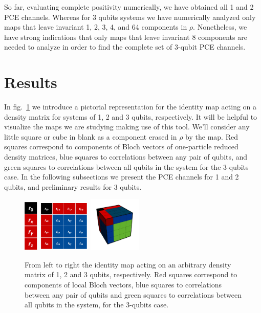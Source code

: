 \documentclass[11pt,dvipsnames]{article} %
\newcommand{\pce}{PCE}
\newcommand{\fref}[1]{fig.~\ref{#1}}  \newcommand{\tref}[1]{table~\ref{#1}}
\newcommand{\1}{\mathds{1}}
\begin{document}
So far, evaluating complete positivity numerically, we have obtained all 1 and 2 \pce{} channels. Whereas for $3$ qubits systems we have numerically analyzed only maps that leave 
invariant 1, 2, 3, 4, and 64 components in $\rho$. Nonetheless, we have strong
indications that only maps that leave invariant 8 components are 
needed to analyze in order to find the complete set of 3-qubit PCE 
channels.
\section*{Results} %
In \fref{fig:pictorial-rep-rho} we introduce a pictorial representation 
for the identity map acting on a density matrix for systems 
of 1, 2 and 3 qubits,
respectively. It will be helpful to visualize the maps we are studying 
making use of this tool. We'll consider any little square or cube in blank
as a component erased in $\rho$ by the map. 
Red squares correspond to components of Bloch vectors of one-particle reduced density matrices,
blue squares to correlations between any pair of qubits, and
green squares to correlations between all qubits in the system for
the 3-qubits case.
In the following subsections we present the PCE channels for
1 and 2 qubits, and preliminary results for 3 qubits.
\begin{figure}[H] %
	\centering
	\hfill \hfill
	\includegraphics[height=2.5cm]
	{img/tablero-1q}
	\hfill
	\includegraphics[width=2.5cm]
	{img/rho2q(2)}
	\hfill 
	\includegraphics[width=2.5cm]
	{img/rho-3q}
	\hfill \hfill
	\caption{From left to right the identity map acting on
  an arbitrary density matrix of 1, 2 and 3 qubits, respectively. 
	Red squares correspond to components of local Bloch vectors,
	blue squares to correlations between any pair of qubits and
	green squares to correlations between all qubits in the system, for
	the 3-qubits case. }
	\label{fig:pictorial-rep-rho}
\end{figure} %
\end{document}
